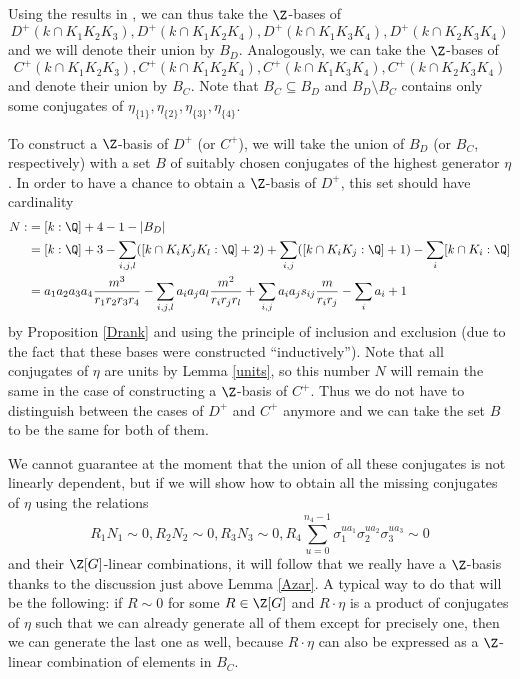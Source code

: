 Using the results in \citep{Kucera2016}, we can thus take the $\Z$-bases of $$D^+(k\cap K_1K_2K_3),D^+(k\cap K_1K_2K_4),D^+(k\cap K_1K_3K_4),D^+(k\cap K_2K_3K_4)$$
and we will denote their union by $B_D$. Analogously, we can take the $\Z$-bases of $$C^+(k\cap K_1K_2K_3),C^+(k\cap K_1K_2K_4),C^+(k\cap K_1K_3K_4),C^+(k\cap K_2K_3K_4)$$
and denote their union by $B_C$. Note that $B_C\subseteq B_D$ and $B_D\setminus B_C$ contains only some conjugates of $\eta_{\{1\}},\eta_{\{2\}},\eta_{\{3\}},\eta_{\{4\}}.$

To construct a $\Z$-basis of $D^+$ (or $C^+$), we will take the union of $B_D$ (or $B_C$, respectively) with a set $B$ of suitably chosen conjugates of the highest generator $\eta$. In order to have a chance to obtain a $\Z$-basis of $D^+$, this set should have cardinality
\begin{align}\label{Ndef}
N:&=[k:\Q]+4-1-|B_D|\\
&=[k:\Q]+3-\sum_{i,j,l}([k\cap K_iK_jK_l:\Q]+2)+\sum_{i,j}([k\cap K_iK_j:\Q]+1)-\sum_{i}[k\cap K_i:\Q]\\
&=a_1a_2a_3a_4\frac{m^3}{r_1r_2r_3r_4}-\sum_{i,j,l}a_ia_ja_l\frac{m^2}{r_ir_jr_l}+\sum_{i,j}
a_ia_js_{ij}\frac{m}{r_ir_j}-\sum_{i}a_i+1
\end{align}
by Proposition \ref{Drank} and using the principle of inclusion and exclusion (due to the fact that these bases were constructed \enquote{inductively}). Note that all conjugates of $\eta$ are units by Lemma \ref{units}, so this number $N$ will remain the same in the case of constructing a $\Z$-basis of $C^+$. Thus we do not have to distinguish between the cases of $D^+$ and $C^+$ anymore and we can take the set $B$ to be the same for both of them.

We cannot guarantee at the moment that the union of all these conjugates is not linearly dependent, but if we will show how to obtain all the missing conjugates of $\eta$ using the relations $$R_1N_1\sim 0, R_2N_2\sim 0, R_3N_3\sim 0, R_4\sum_{u=0}^{n_4-1}\sigma_1^{ua_1}\sigma_2^{ua_2}\sigma_3^{ua_3}\sim 0$$
and their $\Z[G]$-linear combinations, it will follow that we really have a $\Z$-basis thanks to the discussion just above Lemma \ref{Azar}. A typical way to do that will be the following: if $R\sim 0$ for some $R\in\Z[G]$ and $R\cdot \eta$ is a product of conjugates of $\eta$ such that we can already generate all of them except for precisely one, then we can generate the last one as well, because $R\cdot \eta$ can also be expressed as a $\Z$-linear combination of elements in $B_C$.


